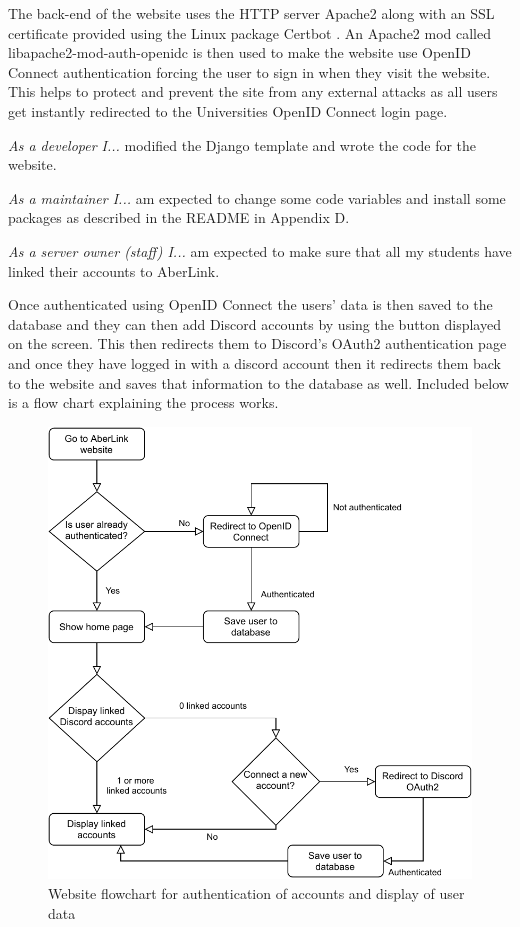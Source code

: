 The back-end of the website uses the HTTP server Apache2 \cite{apache2} along with an SSL certificate provided using the Linux package Certbot \cite{certbot}. An Apache2 mod called libapache2-mod-auth-openidc \cite{libapache2-mod-auth-openidc} is then used to make the website use OpenID Connect \cite{OpenID} authentication forcing the user to sign in when they visit the website. This helps to protect and prevent the site from any external attacks as all users get instantly redirected to the Universities OpenID Connect login page. 

\textit{As a developer I...} modified the Django template and wrote the code for the website.

\textit{As a maintainer I...} am expected to change some code variables and install some packages as described in the README in Appendix D.

\textit{As a server owner (staff) I...} am expected to make sure that all my students have linked their accounts to AberLink.

Once authenticated using OpenID Connect the users' data is then saved to the database and they can then add Discord accounts by using the button displayed on the screen. This then redirects them to Discord's OAuth2 authentication page and once they have logged in with a discord account then it redirects them back to the website and saves that information to the database as well. Included below is a flow chart explaining the process works.

\begin{figure}[H]
	\centering
	\includegraphics[width=0.8\linewidth]{Figures/website-flowchart}
	\caption{Website flowchart for authentication of accounts and display of user data}
	\label{fig:architecture-web-flow}
\end{figure}

